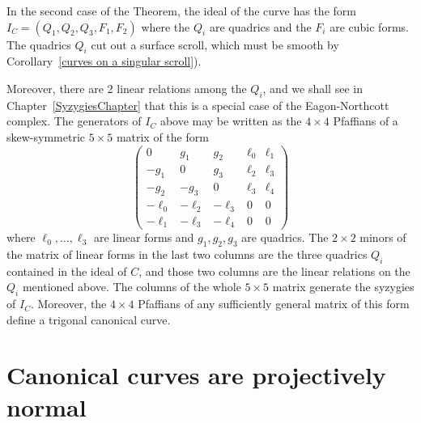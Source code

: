 \begin{fact}
In the second case of the Theorem, the ideal of the curve has the form $I_C = (Q_1, Q_2, Q_3, F_1, F_2)$ 
where the $Q_i$ are quadrics and the $F_i$ are cubic forms. The quadrics $Q_i$ cut out a surface scroll, which
must be smooth by Corollary~\ref{curves on a singular scroll}).

Moreover, there are 2 linear relations among the
$Q_i$, and we shall see in Chapter~\ref{SyzygiesChapter} that this is a special case of the Eagon-Northcott
complex. The generators of $I_C$ above may be written as the $4\times 4$ Pfaffians
of a skew-symmetric $5\times 5$ matrix of the form
$$
\begin{pmatrix}
0&g_1&g_2&\ell_0&\ell_1\\
-g_1&0&g_3&\ell_2&\ell_3\\
-g_2&-g_3&0 &\ell_3&\ell_4\\
-\ell_0&-\ell_2&-\ell_3&0&0\\
-\ell_1&-\ell_3&-\ell_4&0&0
\end{pmatrix}
$$
where $\ell_0,\dots,\ell_3$ are linear forms and $g_1, g_2, g_3$ are quadrics. The
 $2\times 2$
minors of the matrix of linear forms in the last two columns are the three quadrics $Q_i$ contained in the ideal
of $C$, and those two columns are the linear relations on the $Q_i$ mentioned above.
The columns of the whole $5\times 5$ matrix generate the syzygies of $I_C$. Moreover, the
$4\times 4$ Pfaffians of any sufficiently general matrix of this form define a trigonal canonical curve.
\end{fact}


\section{Canonical curves are projectively normal}\label{Noether theorem section}

